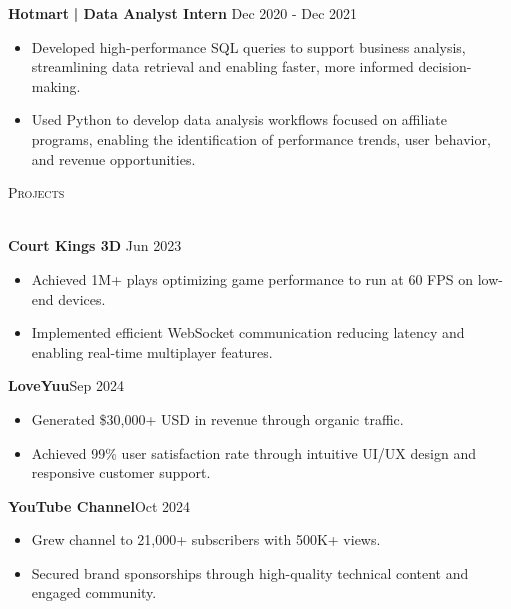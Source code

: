 \documentclass[a4paper]{article}
\newcommand{\lineunder}{
    \vspace*{-8pt} \\
    \hspace*{-18pt} \hrulefill \\
}
\newcommand{\header}[1]{
    {\hspace*{-18pt}\vspace*{6pt} \textsc{#1}}
    \vspace*{-6pt} \lineunder
}
\begin{document}
    \textbf{Hotmart}\textbf{ | Data Analyst Intern} \hfill  Dec 2020 - Dec 2021\\
    \vspace{-3mm}
    \begin{itemize} \itemsep -3pt
        \item Developed high-performance SQL queries to support business analysis, streamlining data retrieval and enabling faster, more informed decision-making.
        \item Used Python to develop data analysis workflows focused on affiliate programs, enabling the identification of performance trends, user behavior, and revenue opportunities.
    \end{itemize}

    \header{Projects}
    \vspace{2mm}

    \textbf{Court Kings 3D} \hfill  Jun 2023\\
    \vspace{-3mm}
    \begin{itemize} \itemsep -3pt
        \item Achieved 1M+ plays optimizing game performance to run at 60 FPS on low-end devices.
        \item Implemented efficient WebSocket communication reducing latency and enabling real-time multiplayer features.
    \end{itemize}

    \textbf{LoveYuu}\hfill  Sep 2024\\
    \vspace{-3mm}
    \begin{itemize} \itemsep -3pt
        \item Generated \$30,000+ USD in revenue through organic traffic.
        \item Achieved 99\% user satisfaction rate through intuitive UI/UX design and responsive customer support.
    \end{itemize}

    \textbf{YouTube Channel}\hfill  Oct 2024\\
    \vspace{-3mm}
    \begin{itemize} \itemsep -3pt
        \item Grew channel to 21,000+ subscribers with 500K+ views.
        \item Secured brand sponsorships through high-quality technical content and engaged community.
    \end{itemize}
\end{document}
